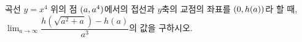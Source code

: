곡선 $y=x^4$ 위의 점 $(a{,}\mkern3mu\mathopen{}a^4)$에서의 접선과 $y$축의 교점의 좌표를 $(0{,}\mkern3mu\mathopen{}h(a))$라 할 때, $\displaystyle\lim_{a\to\infty}\dfrac{h(\sqrt{a^2+a})-h(a)}{a^3}$의 값을 구하시오.
